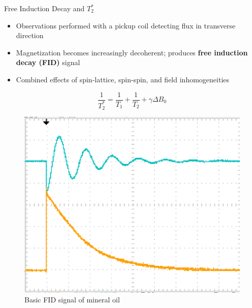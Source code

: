 \documentclass[aspectratio=169,xcolor=dvipsnames]{beamer}
\begin{document}
\begin{frame}{Free Induction Decay and $T_2^*$}

    \begin{minipage}{0.6\textwidth}
        \begin{itemize}
            \item Observations performed with a pickup coil detecting flux in transverse direction
            \item Magnetization becomes increasingly decoherent; produces \textbf{free induction decay (FID)} signal
            \item Combined effects of spin-lattice, spin-spin, and field inhomogeneities \cite{principles-resonance}
        \end{itemize}
        \begin{equation}
            \frac{1}{T_2^*} = \frac{1}{T_1}+\frac{1}{T_2}+ \gamma \Delta B_0
        \end{equation}
    \end{minipage}
    \hfill
    \begin{minipage}{0.3\textwidth}
        \begin{figure}
            \centering
            \includegraphics[width=\textwidth]{figs/basic_fid.png}
            \caption{Basic FID signal of mineral oil \cite{lab-manual}}
        \end{figure}
    \end{minipage}
    
\end{frame}
\end{document}
